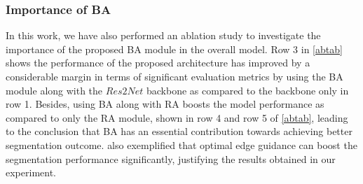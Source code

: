 \documentclass[review]{elsarticle}
\begin{document}
\begin{table*}[]
\centering
\caption{Results of the ablation study considering various components of the MFSNet model on the $PH^2$ dataset. Best results are highlighted.}
\label{abtab}
\end{table*}

\subsubsection{Importance of BA}
In this work, we have also performed an ablation study to investigate the importance of the proposed BA module in the overall model. Row 3 in \autoref{abtab} shows the performance of the proposed architecture has improved by a considerable margin in terms of significant evaluation metrics by using the BA module along with the $Res2Net$ backbone as compared to the backbone only in row 1. Besides, using BA along with RA boosts the model performance as compared to only the RA module, shown in row 4 and row 5 of \autoref{abtab}, leading to the conclusion that BA has an essential contribution towards achieving better segmentation outcome. \cite{zhang2019net} also exemplified that optimal edge guidance can boost the segmentation performance significantly, justifying the results obtained in our experiment.
\end{document}
